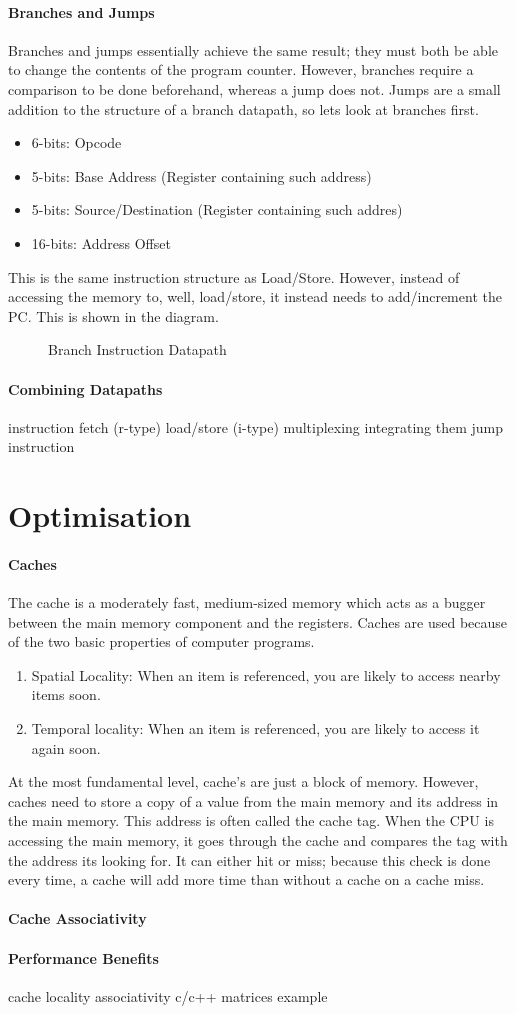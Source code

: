 \paragraph{Branches and Jumps}
Branches and jumps essentially achieve the same result; they must both be able to change the contents of the program counter. However, branches require a comparison to be done beforehand, whereas a jump does not. Jumps are a small addition to the structure of a branch datapath, so lets look at branches first.
\begin{itemize}
	\item 6-bits: Opcode
	\item 5-bits: Base Address (Register containing such address)
	\item 5-bits: Source/Destination (Register containing such addres)
	\item 16-bits: Address Offset
\end{itemize}
This is the same instruction structure as Load/Store. However, instead of accessing the memory to, well, load/store, it instead needs to add/increment the PC. This is shown in the diagram.
\begin{figure}[!htb]
	\caption{\label{fig:branch} Branch Instruction Datapath}
\end{figure}
\paragraph{Combining Datapaths}
instruction fetch (r-type)
load/store (i-type)
multiplexing
integrating them
jump instruction

\section{Optimisation}
\paragraph{Caches}
The cache is a moderately fast, medium-sized memory which acts as a bugger between the main memory component and the registers. Caches are used because of the two basic properties of computer programs.
\begin{enumerate}
	\item Spatial Locality: When an item is referenced, you are likely to access nearby items soon.
	\item Temporal locality: When an item is referenced, you are likely to access it again soon.
\end{enumerate}
At the most fundamental level, cache's are just a block of memory. However, caches need to store a copy of a value from the main memory and its address in the main memory. This address is often called the cache tag. When the CPU is accessing the main memory, it goes through the cache and compares the tag with the address its looking for. It can either hit or miss; because this check is done every time, a cache will add more time than without a cache on a cache miss.
\paragraph{Cache Associativity}
\paragraph{Performance Benefits}

cache
locality
associativity
c/c++ matrices example